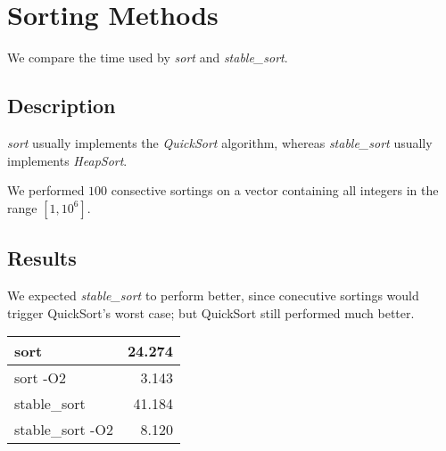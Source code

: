 \section{Sorting Methods}
We compare the time used by \emph{sort} and \emph{stable\_sort}.
\subsection{Description}
\emph{sort} usually implements the \emph{QuickSort} algorithm, whereas 
\emph{stable\_sort} usually implements \emph{HeapSort}.

We performed $100$ consective sortings on a vector containing all integers in the range
$[1, 10^{6}]$.

\subsection{Results}
We expected \emph{stable\_sort} to perform better, since conecutive sortings 
would trigger QuickSort's worst case; but QuickSort still performed much better.

\begin{center}
\begin{tabular}{ | l | r |}
\hline
sort & 24.274 \\ \hline
sort -O2 & 3.143 \\ \hline
stable\_sort & 41.184 \\ \hline
stable\_sort -O2 & 8.120 \\
\hline
\end{tabular}
\end{center}

